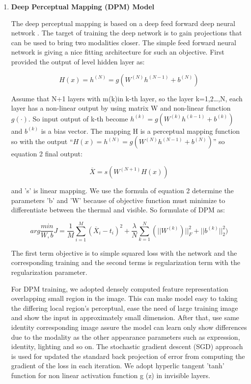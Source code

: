 \documentclass[a4paper, 12pt]{article}
\begin{document}
\begin{enumerate}[I]

\item \textbf{{\large Deep Perceptual Mapping (DPM) Model}}

 The deep perceptual mapping is based on a deep feed forward deep neural network \cite{5}. The target of training the deep network is to gain projections that can be used to bring two modalities closer. The simple feed forward neural network is giving a nice fitting architecture for such an objective. First provided the output of level hidden layer as:
 
 \begin{equation}
H(x) = h^{(N)} = g(W^{(N)}h^{(N-1)} +b^{(N)})
\end{equation}
 
 Assume that N+1 layers with m(k)in k-th layer, so the layer k=1,2…,N, each layer has a non-linear output by using matrix W and non-linear function $g(\cdot )$. So input output of k-th become $h^{(k)} = g(W^{(k)}h^{(k-1)} +b^{(k)})$ and $b^{(k)}$ is a bias vector. The mapping H is a perceptual mapping function so with the output “$H(x) = h^{(N)} = g(W^{(N)}h^{(N-1)} +b^{(N)})$” so equation 2 final output:
 
 \begin{equation}
  \overline{X} = s(W^{(N+1)}H(x))
  \end{equation}
  
   and 's' is linear mapping. We use the formula of equation 2 determine the parameters 'b' and 'W' because of objective function must minimize to differentiate between the thermal and visible. So formulate of DPM as:
   
\begin{equation}
arg \frac{min}{W,b} J = \frac{1}{M} \sum_{i=1}^{M} ({\overline{X}}_{i}-{t}_{i})^2 + \frac{\lambda}{N} \sum_{k=1}^{N} (||W^{(k)})|| _{F}^{2} + || b^{(k)}|| _{2}^{2})
 \end{equation}
 
The first term objective is to simple squared loss with the network and the corresponding training and the second terms is regularization term with the regularization parameter.
 
For DPM training, we adopted densely computed feature representation overlapping small region in the image. This can make model easy to taking the differing local region's perceptual, ease the need of large training image and show the input in approximately small dimension. After that, use same identity corresponding image assure the model can learn only show differences due to the modality as the other appearance parameters such as expression, identity, lighting and so on. The stochastic gradient descent (SGD) \cite{sgd} approach is used for updated the standard back projection of error from computing the gradient of the loss in each iteration. We adopt hyperlic tangent 'tanh' function for non linear activation function g (z) in invisible layers.


\end{enumerate}
\end{document}
